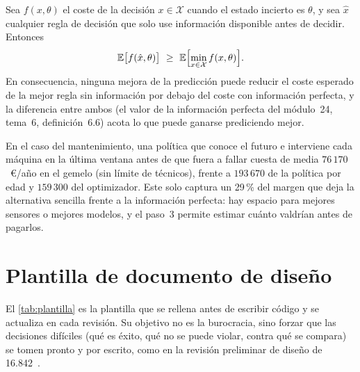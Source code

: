 \begin{proposicion}\label{prop:techo}
Sea $f(x,\theta)$ el coste de la decisión $x\in\mathcal{X}$ cuando el estado incierto es $\theta$, y sea $\hat x$ cualquier regla de decisión que solo use información disponible antes de decidir. Entonces
\[
\E\bigl[f(\hat x,\theta)\bigr]\ \ge\ \E\Bigl[\min_{x\in\mathcal{X}}f(x,\theta)\Bigr].
\]
En consecuencia, ninguna mejora de la predicción puede reducir el coste esperado de la mejor regla sin información por debajo del coste con información perfecta, y la diferencia entre ambos (el valor de la información perfecta del módulo~24, tema~6, definición~6.6) acota lo que puede ganarse prediciendo mejor.
\end{proposicion}

En el caso del mantenimiento, una política que conoce el futuro e interviene cada máquina en la última ventana antes de que fuera a fallar cuesta de media $76\,170$~€/año en el gemelo (sin límite de técnicos), frente a $193\,670$ de la política por edad y $159\,300$ del optimizador. Este solo captura un 29\,\% del margen que deja la alternativa sencilla frente a la información perfecta: hay espacio para mejores sensores o mejores modelos, y el paso~3 permite estimar cuánto valdrían antes de pagarlos.

\section{Plantilla de documento de diseño}

El \cref{tab:plantilla} es la plantilla que se rellena antes de escribir código y se actualiza en cada revisión. Su objetivo no es la burocracia, sino forzar que las decisiones difíciles (qué es éxito, qué no se puede violar, contra qué se compara) se tomen pronto y por escrito, como en la revisión preliminar de diseño de 16.842~\cite{mit16842}.

